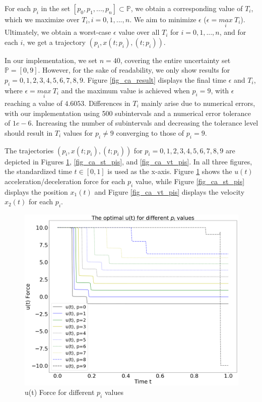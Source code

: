 \documentclass  [
  paper    = a4,
  BCOR     = 10mm,
  twoside,
  fontsize = 12pt,
  fleqn,
  toc      = bibnumbered,
  toc      = listofnumbered,
  numbers  = noendperiod,
  headings = normal,
  listof   = leveldown,
  version  = 3.03
]                                       {scrreprt}
\newcommand{\<}{\langle}
\renewcommand{\>}{\rangle}
\begin{document}
For each $p_i$ in the set $[p_0, p_1, ..., p_n] \subset \mathbb{P}$, we obtain a corresponding value of $T_i$, which we maximize over $T_i, i =0, 1, ..., n$. We aim to minimize $\epsilon$ ($\epsilon = \underset{i}{max} \ T_i$). Ultimately, we obtain a worst-case $\epsilon$ value over all $T_i$ for $i=0,1,...,n$, and for each $i$, we get a trajectory $(p_i, x(t;p_i), (t;p_i))$.

In our implementation, we set $n=40$, covering the entire uncertainty set $\mathbb{P}=[0,9]$. However, for the sake of readability, we only show results for $p_i=0, 1, 2, 3, 4, 5, 6, 7, 8, 9$. Figure \ref{fig_ca_result} displays the final time $\epsilon$ and $T_i$, where $\epsilon = \underset{i}{max} \ T_i$ and the maximum value is achieved when $p_i=9$, with $\epsilon$ reaching a value of $4.6053$. Differences in $T_i$ mainly arise due to numerical errors, with our implementation using 500 subintervals and a numerical error tolerance of $1e-6$. Increasing the number of subintervals and decreasing the tolerance level should result in $T_i$ values for $p_i \neq 9$ converging to those of $p_i=9$.

The trajectories $(p_i, x(t;p_i), (t;p_i))$ for $p_i=0, 1, 2, 3, 4, 5, 6, 7, 8, 9$ are depicted in Figures \ref{fig_ca_ut_pis}, \ref{fig_ca_st_pis}, and \ref{fig_ca_vt_pis}. In all three figures, the standardized time $t \in [0,1]$ is used as the x-axis. Figure \ref{fig_ca_ut_pis} shows the $u(t)$ acceleration/deceleration force for each $p_i$ value, while Figure \ref{fig_ca_st_pis} displays the position $x_1(t)$ and Figure \ref{fig_ca_vt_pis} displays the velocity $x_2(t)$ for each $p_i$.



\begin{figure}[H]
	\centerline{\includegraphics[width=13cm]{ca_ut_pis.png}}
	\caption{u(t) Force for different $p_i$ values}
	\label{fig_ca_ut_pis}
\end{figure}
\end{document}
